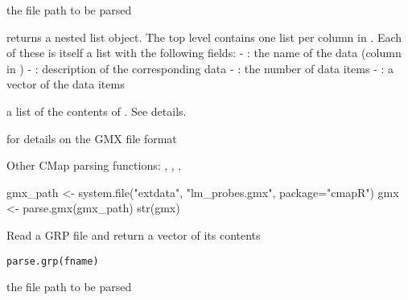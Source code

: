 \documentclass[letterpaper]{book}
\begin{document}
%
\begin{Arguments}
\begin{ldescription}
\item[\code{fname}] the file path to be parsed
\end{ldescription}
\end{Arguments}
%
\begin{Details}\relax
{} returns a nested list object. The top
level contains one list per column in . Each of 
these is itself a list with the following fields:
- : the name of the data (column in )
- : description of the corresponding data
- : the number of data items
- : a vector of the data items
\end{Details}
%
\begin{Value}
a list of the contents of . See details.
\end{Value}
%
\begin{SeeAlso}\relax
{} for details on the GMX file format

Other CMap parsing functions: ,
, ,
\end{SeeAlso}
%
\begin{Examples}
\begin{ExampleCode}
gmx_path <- system.file("extdata", "lm_probes.gmx", package="cmapR")
gmx <- parse.gmx(gmx_path)
str(gmx)

\end{ExampleCode}
\end{Examples}
%
\begin{Description}\relax
Read a GRP file and return a vector of its contents
\end{Description}
%
\begin{Usage}
\begin{verbatim}
parse.grp(fname)
\end{verbatim}
\end{Usage}
%
\begin{Arguments}
\begin{ldescription}
\item[\code{fname}] the file path to be parsed
\end{ldescription}
\end{Arguments}
\end{document}
